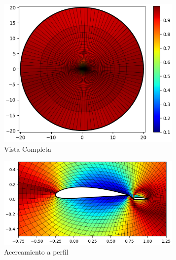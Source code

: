 \documentclass[letterpaper, openright, 12pt]{book}
\begin{document}
    \begin{figure}[htbp!]
        \begin{subfigure}[c]{0.48\textwidth}
            \includegraphics[keepaspectratio, width=0.99\textwidth]
                {./img/naca4415_flap_skew_far}
            \caption{Vista Completa}
            \label{fig:naca4415_flap_skew_far}
        \end{subfigure}
        \hfill
        \begin{subfigure}[c]{0.48\textwidth}
            \includegraphics[keepaspectratio, width=0.99\textwidth]
                {./img/naca4415_flap_skew_close}
            \caption{Acercamiento a perfil}
            \label{fig:naca4415_flap_skew_close}
        \end{subfigure}
        \begin{subfigure}[c]{0.48\textwidth}

\end{subfigure}
\end{figure}
\end{document}
